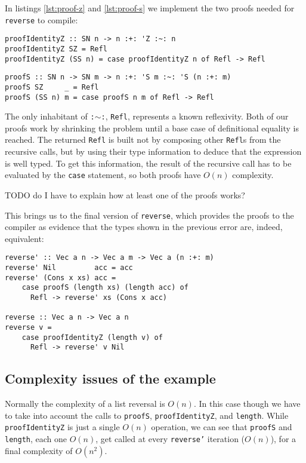 In listings \ref{lst:proof-z} and \ref{lst:proof-s} we implement the two proofs needed for \texttt{reverse} to compile:

\begin{lstlisting}[caption=A proof of the right identity element in type-level addition, label=lst:proof-z]
proofIdentityZ :: SN n -> n :+: 'Z :~: n
proofIdentityZ SZ = Refl
proofIdentityZ (SS n) = case proofIdentityZ n of Refl -> Refl
\end{lstlisting}

\begin{lstlisting}[caption=A proof that $n+(m+1) \sim (n+m)+1$, label=lst:proof-s]
proofS :: SN n -> SN m -> n :+: 'S m :~: 'S (n :+: m)
proofS SZ     _ = Refl
proofS (SS n) m = case proofS n m of Refl -> Refl
\end{lstlisting}

The only inhabitant of \texttt{:$\sim$:}, \texttt{Refl}, represents a known reflexivity.
Both of our proofs work by shrinking the problem until a base case of definitional equality is reached.
The returned \texttt{Refl} is built not by composing other \texttt{Refl}s from the recursive calls, but by using their type information to deduce that the expression is well typed.
To get this information, the result of the recursive call has to be evaluated by the \texttt{case} statement, so both proofs have $O(n)$ complexity.

TODO do I have to explain how at least one of the proofs works?

This brings us to the final version of \texttt{reverse}, which provides the proofs to the compiler as evidence that the types shown in the previous error are, indeed, equivalent:

\begin{lstlisting}[caption=Length-indexed vector reversal]
reverse' :: Vec a n -> Vec a m -> Vec a (n :+: m)
reverse' Nil         acc = acc
reverse' (Cons x xs) acc =
    case proofS (length xs) (length acc) of
      Refl -> reverse' xs (Cons x acc)

reverse :: Vec a n -> Vec a n
reverse v =
    case proofIdentityZ (length v) of
      Refl -> reverse' v Nil
\end{lstlisting}

\subsection{Complexity issues of the example}
\label{subsec:complexity-issues}

Normally the complexity of a list reversal is $O(n)$.
In this case though we have to take into account the calls to \texttt{proofS}, \texttt{proofIdentityZ}, and \texttt{length}.
While \texttt{proofIdentityZ} is just a single $O(n)$ operation, we can see that \texttt{proofS} and \texttt{length}, each one $O(n)$, get called at every \texttt{reverse'} iteration ($O(n)$), for a final complexity of $O(n^2)$.

